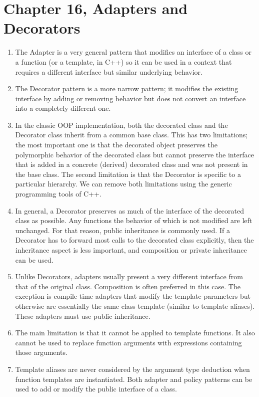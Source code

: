 \section{Chapter 16, Adapters and Decorators}

\begin{enumerate}
\item
  The Adapter is a very general pattern that modifies an interface of a class or a function (or a template, in C++) so it can be used in a context that requires a different interface but similar underlying behavior.
\item
  The Decorator pattern is a more narrow pattern; it modifies the existing interface by adding or removing behavior but does not convert an interface into a completely different one.
\item
  In the classic OOP implementation, both the decorated class and the Decorator class inherit from a common base class. This has two limitations; the most important one is that the decorated object preserves the polymorphic behavior of the decorated class but cannot preserve the interface that is added in a concrete (derived) decorated class and was not present in the base class. The second limitation is that the Decorator is specific to a particular hierarchy. We can remove both limitations using the generic programming tools of C++.
\item
  In general, a Decorator preserves as much of the interface of the decorated class as possible. Any functions the behavior of which is not modified are left unchanged. For that reason, public inheritance is commonly used. If a Decorator has to forward most calls to the decorated class explicitly, then the inheritance aspect is less important, and composition or private inheritance can be used.
\item
  Unlike Decorators, adapters usually present a very different interface from that of the original class. Composition is often preferred in this case. The exception is compile-time adapters that modify the template parameters but otherwise are essentially the same class template (similar to template aliases). These adapters must use public inheritance.
\item
  The main limitation is that it cannot be applied to template functions. It also cannot be used to replace function arguments with expressions containing those arguments.
\item
  Template aliases are never considered by the argument type deduction when function templates are instantiated. Both adapter and policy patterns can be used to add or modify the public interface of a class.

\end{enumerate}
